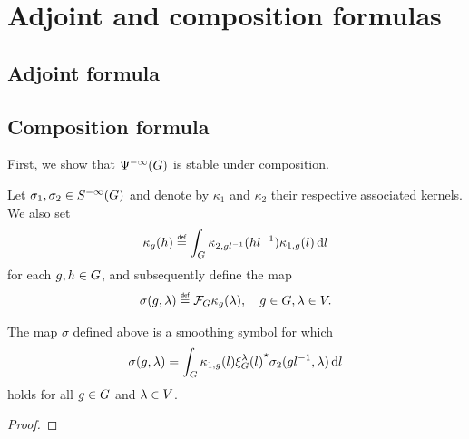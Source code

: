 \begin{remark}[Kernel estimate when $m = -\dim \Group$]
\end{remark}

\section{Adjoint and composition formulas}

\subsection{Adjoint formula}

\subsection{Composition formula}

First, we show that ${\Psi^{-\infty} (G)}$ is stable under composition.

\begin{lemma}
    Let $\sigma_1, \sigma_2 \in {S^{-\infty} (G)}$
    and denote by $\kappa_1$ and $\kappa_2$ their respective associated kernels.
    We also set
    \begin{align*}
        \kappa_g(h) \defeq \int_\Group \kappa_{2, g l^{-1}}(h l^{-1}) \kappa_{1, g}(l) \dd l
    \end{align*}
    for each $g, h \in G$,
    and subsequently define the map
    \begin{align*}
        \sigma(g, \lambda) \defeq \Fourier \kappa_g(\lambda),
        \quad g \in \Group, \lambda \in \VectorSpace.
    \end{align*}

    The map $\sigma$ defined above is a smoothing symbol for which
    \begin{align*}
        \sigma(g, \lambda) = \int_G \kappa_{1, g}(l) {\xi^{\lambda}_{G}(l)}^\star \sigma_2(g l^{-1}, \lambda) \,\mathrm{d} l
    \end{align*}
    holds for all $g \in G$ and $\lambda \in V$.
\end{lemma}
\begin{proof}
\end{proof}

